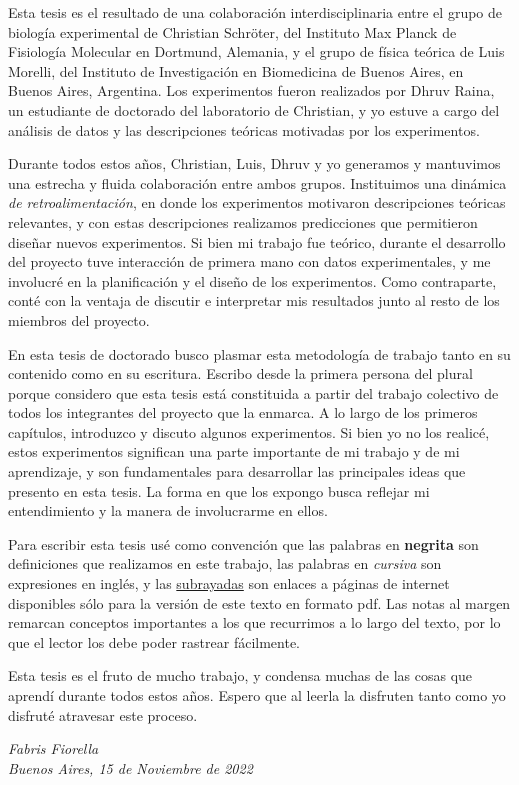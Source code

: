 \documentclass[./main.tex]{subfiles}
\begin{document}

Esta tesis es el resultado de una colaboración interdisciplinaria entre el grupo de biología experimental de Christian Schröter, del Instituto Max Planck de Fisiología Molecular en Dortmund, Alemania, y el grupo de física teórica de Luis Morelli, del Instituto de Investigación en Biomedicina de Buenos Aires, en Buenos Aires, Argentina. Los experimentos fueron realizados por Dhruv Raina, un estudiante de doctorado del laboratorio de Christian, y yo estuve a cargo del análisis de datos y las descripciones teóricas motivadas por los experimentos. 


Durante todos estos años, Christian, Luis, Dhruv y yo generamos y mantuvimos una estrecha y fluida colaboración entre ambos grupos. Instituimos una dinámica \textit{de retroalimentación}, en donde los experimentos motivaron descripciones teóricas relevantes, y con estas descripciones realizamos predicciones que permitieron diseñar nuevos experimentos. Si bien mi trabajo fue teórico, durante el desarrollo del proyecto tuve interacción de primera mano con datos experimentales, y me involucré en la planificación y el diseño de los experimentos. Como contraparte, conté con la ventaja de discutir e interpretar mis resultados junto al resto de los miembros del proyecto. 


En esta tesis de doctorado busco plasmar esta metodología de trabajo tanto en su contenido como en su escritura. Escribo desde la primera persona del plural porque considero que esta tesis está constituida a partir del trabajo colectivo de todos los integrantes del proyecto que la enmarca. A lo largo de los primeros capítulos, introduzco y discuto algunos experimentos. Si bien yo no los realicé, estos experimentos significan una parte importante de mi trabajo y de mi aprendizaje, y son fundamentales para desarrollar las principales ideas que presento en esta tesis. La forma en que los expongo busca reflejar mi entendimiento y la manera de involucrarme en ellos. 

Para escribir esta tesis usé como convención que las palabras en \textbf{negrita} son definiciones que realizamos en este trabajo, las palabras en \textit{cursiva} son expresiones en inglés, y las \underline{subrayadas} son enlaces a páginas de internet disponibles sólo para la versión de este texto en formato pdf. Las notas al margen remarcan conceptos importantes a los que recurrimos a lo largo del texto, por lo que el lector los debe poder rastrear fácilmente. 

Esta tesis es el fruto de mucho trabajo, y condensa muchas de las cosas que aprendí durante todos estos años. Espero que al leerla la disfruten tanto como yo disfruté atravesar este proceso. 

\vspace{\baselineskip}

\begin{flushright}\noindent
{\it Fabris Fiorella \\Buenos Aires, 15 de Noviembre de 2022}
\end{flushright}
\end{document}
